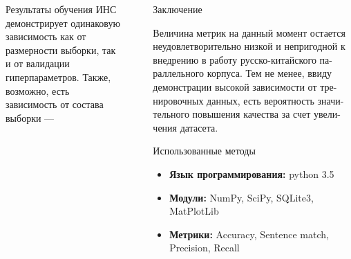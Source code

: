 \documentclass[final]{beamer}
\newlength{\sepwid}
\newlength{\onecolwid}
\newlength{\twocolwid}
\begin{document}
\begin{frame}
\begin{columns}[t]
\begin{column}{\twocolwid}
\begin{columns}[t,totalwidth=\twocolwid]
\begin{column}{\onecolwid}
\begin{exampleblock}{Результаты обучения}
ИНС демонстрирует одинаковую зависимость как от размерности выборки, так и от валидации гиперпараметров. Также, возможно, есть зависимость от состава выборки — 

\end{exampleblock}


\end{column} %

\end{columns} %

\end{column} %

\begin{column}{\sepwid}\end{column} %

\begin{column}{\onecolwid} %


\begin{exampleblock}{Заключение}

Величина метрик на данный момент остается неудовлетворительно низкой и непригодной к внедрению в работу русско-китайского па- раллельного корпуса. Тем не менее, ввиду демонстрации высокой зависимости от тре- нировочных данных, есть вероятность значи- тельного повышения качества за счет увели- чения датасета.

\end{exampleblock}


\begin{exampleblock}{Использованные методы}
\begin{itemize}
\item \textbf{Язык программирования:} python 3.5
\item \textbf{Модули:} NumPy, SciPy, SQLite3, MatPlotLib
\item \textbf{Метрики:} Accuracy, Sentence match, Precision, Recall
\end{itemize}


\end{exampleblock}
\end{column}
\end{columns}
\end{frame}
\end{document}
